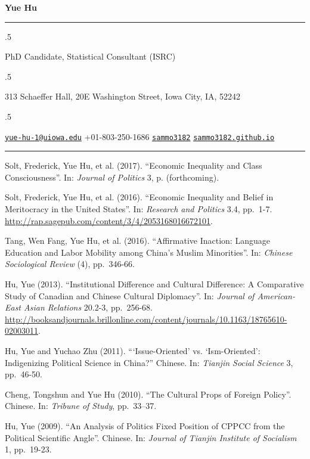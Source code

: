 \documentclass[10.5pt,]{article}
\begin{document}
\centerline{\huge \bf Yue Hu}

\vspace{2 mm}

\hrule

\vspace{2 mm}

\moveleft.5\hoffset\centerline{PhD Candidate, Statistical Consultant (ISRC)}
\moveleft.5\hoffset\centerline{313 Schaeffer Hall, 20E Washington Street, Iowa City, IA, 52242}
\moveleft.5\hoffset\centerline{ \faEnvelopeO \hspace{1 mm} \href{mailto:}{\tt \href{mailto:yue-hu-1@uiowa.edu}{\nolinkurl{yue-hu-1@uiowa.edu}}} \hspace{1 mm}  \faPhone \hspace{1 mm}  +01-803-250-1686  \hspace{1 mm}  \faGithub \hspace{1 mm} \href{http://github.com/sammo3182}{\tt sammo3182} \hspace{1 mm}    \faGlobe \hspace{1 mm} \href{http://sammo3182.github.io}{\tt sammo3182.github.io}   }

\vspace{2 mm}

\hrule


 Solt, Frederick, Yue Hu, et al. (2017). ``Economic
Inequality and Class Consciousness''. In: \emph{Journal of Politics} 3,
p. (forthcoming).

 Solt, Frederick, Yue Hu, et al. (2016). ``Economic
Inequality and Belief in Meritocracy in the United States''. In:
\emph{Research and Politics} 3.4, pp.~1-7.
\url{http://rap.sagepub.com/content/3/4/2053168016672101}.

 Tang, Wen Fang, Yue Hu, et al. (2016).
``Affirmative Inaction: Language Education and Labor Mobility among
China's Muslim Minorities''. In: \emph{Chinese Sociological Review} (4),
pp.~346-66.

 Hu, Yue (2013). ``Institutional Difference and
Cultural Difference: A Comparative Study of Canadian and Chinese
Cultural Diplomacy''. In:
\emph{Journal of American-East Asian Relations} 20.2-3, pp.~256-68.
\url{http://booksandjournals.brillonline.com/content/journals/10.1163/18765610-02003011}.

 Hu, Yue and Yuchao Zhu (2011). ```Issue-Oriented'
vs. `Ism-Oriented': Indigenizing Political Science in China?'' Chinese.
In: \emph{Tianjin Social Science} 3, pp.~46-50.

 Cheng, Tongshun and Yue Hu (2010). ``The Cultural
Props of Foreign Policy''. Chinese. In: \emph{Tribune of Study},
pp.~33--37.

 Hu, Yue (2009). ``An Analysis of Politics Fixed
Position of CPPCC from the Political Scientific Angle''. Chinese. In:
\emph{Journal of Tianjin Institute of Socialism} 1, pp.~19-23.
\end{document}
